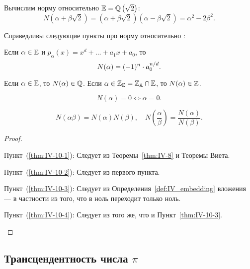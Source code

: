 \begin{example}
    Вычислим норму относительно $\mathbb{E} = \mathbb{Q}\left( \sqrt{2} \right)$:
    \[
        N\left( \alpha + \beta\sqrt{2} \right)
        = \left(\alpha + \beta \sqrt{2}\right)\left(\alpha - \beta \sqrt{2}\right)
        = \alpha^2 - 2\beta^2.
    \]
\end{example}

\begin{ntheorem}
\label{thm:IV-10}
    Справедливы следующие пункты про норму относительно \EE:
    \begin{statesp}
        \item
        \label{thm:IV-10-1}
            Если $\alpha \in \mathbb{E}$ и $p_{\alpha}(x) = x^d + \dots + a_1 x + a_0$, то
            \[
                N(\alpha) = (-1)^n \cdot a_0^{n / d}.
            \]
        \item
        \label{thm:IV-10-2}
            Если $\alpha \in \mathbb{E}$, то $N(\alpha) \in \mathbb{Q}$. 
            Если $\alpha \in \mathbb{Z}_{\mathbb{E}} = \mathbb{Z}_{\mathbb{A}} \cap \mathbb{E}$, то $N(\alpha) \in \mathbb{Z}$.
        \item
        \label{thm:IV-10-3}
            \[
                N(\alpha) = 0 \Leftrightarrow \alpha = 0.
            \]
        \item
        \label{thm:IV-10-4}
            \[
                N(\alpha\beta) = N(\alpha)N(\beta), \quad N\left( \frac{\alpha}{\beta} \right) = \frac{N(\alpha)}{N(\beta)}.
            \]
    \end{statesp}
\end{ntheorem}
\begin{proof}
\hfill
    \begin{statesp}
        \item[Пункт~(\ref{thm:IV-10-1}):]
            Следует из Теоремы~\ref{thm:IV-8} и Теоремы Виета.
        \item[Пункт~(\ref{thm:IV-10-2}):]
            Следует из первого пункта.
        \item[Пункт~(\ref{thm:IV-10-3}):]
            Следует из Определения~\ref{def:IV_embedding} вложения --- в частности из того, что в ноль переходит только ноль.
        \item[Пункт~(\ref{thm:IV-10-4}):]
            Следует из того же, что и Пункт~\ref{thm:IV-10-3}.
    \end{statesp}
\end{proof}


\subsection{\texorpdfstring{Трансцендентность числа $\pi$}{Трансцендентность числа π}}
\label{subsec:IV-5}

